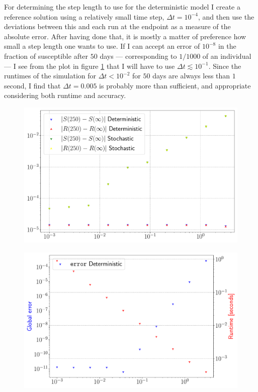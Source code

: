 For determining the step length to use for the deterministic model I create a reference solution using a relatively small time step, $\Delta t = 10^{-4}$, and then use the deviations between this and each run at the endpoint as a measure of the absolute error. After having done that, it is mostly a matter of preference how small a step length one wants to use. If I can accept an error of $10^{-8}$ in the fraction of susceptible after $50$ days --- corresponding to $1/1000$ of an individual --- I see from the plot in figure \ref{fig:timesteps_det} that I will have to use $\Delta t \lesssim 10^{-1}$. Since the runtimes of the simulation for $\Delta t < 10^{-2}$ for $50$ days are always less than $1$ second, I find that $\Delta t = 0.005$ is probably more than sufficient, and appropriate considering both runtime and accuracy.    

\begin{figure}[htb]
\centering
\begin{minipage}[c]{0.49\columnwidth}
	\centering
	\includegraphics[width=\columnwidth]{../fig/timestep.pdf}
	\label{fig:timesteps}
\end{minipage}
\hfill
\begin{minipage}[c]{0.49\columnwidth}
	\centering
	\includegraphics[width=\columnwidth]{../fig/timestep_det.pdf}
	\label{fig:timesteps_det}
\end{minipage}
\end{figure}
